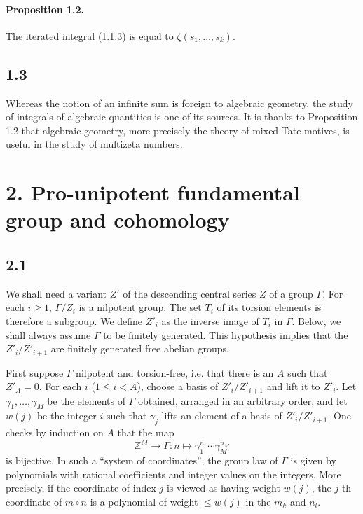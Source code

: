 \documentclass[10pt]{article}
\newcommand{\Z}{\mathbb Z}
\begin{document}
\paragraph{Proposition 1.2.}
The iterated integral (1.1.3) is equal to $\zeta(s_1,\ldots,s_k)$.

\subsection*{1.3}
Whereas the notion of an infinite sum is foreign to algebraic geometry, the study of integrals of algebraic quantities is one of its sources.
It is thanks to Proposition 1.2 that algebraic geometry, more precisely the theory of mixed Tate motives, is useful in the study of multizeta numbers.

\section*{2. Pro-unipotent fundamental group and cohomology}

\subsection*{2.1}
We shall need a variant $Z'$ of the descending central series $Z$ of a group $\Gamma$.
For each $i\geq1$, $\Gamma/Z_i$ is a nilpotent group.
The set $T_i$ of its torsion elements is therefore a subgroup.
We define $Z'_i$ as the inverse image of $T_i$ in $\Gamma$.
Below, we shall always assume $\Gamma$ to be finitely generated.
This hypothesis implies that the $Z'_i/Z'_{i+1}$ are finitely generated free abelian groups.

First suppose $\Gamma$ nilpotent and torsion-free, i.e. that there is an $A$ such that $Z'_A=0$.
For each $i$ ($1\leq i<A$), choose a basis of $Z'_i/Z'_{i+1}$ and lift it to $Z'_i$.
Let $\gamma_1,\ldots,\gamma_M$ be the elements of $\Gamma$ obtained, arranged in an arbitrary order, and let $w(j)$ be the integer $i$ such that $\gamma_j$ lifts an element of a basis of $Z'_i/Z'_{i+1}$.
One checks by induction on $A$ that the map
\[
 \Z^M\longrightarrow \Gamma: n\longmapsto \gamma_1^{n_1}\cdots\gamma_M^{n_M}
\]
is bijective.
In such a ``system of coordinates'', the group law of $\Gamma$ is given by polynomials with rational coefficients and integer values on the integers.
More precisely, if the coordinate of index $j$ is viewed as having weight $w(j)$, the $j$-th coordinate of $m\circ n$ is a polynomial of weight $\leq w(j)$ in the $m_k$ and $n_l$.
\end{document}
